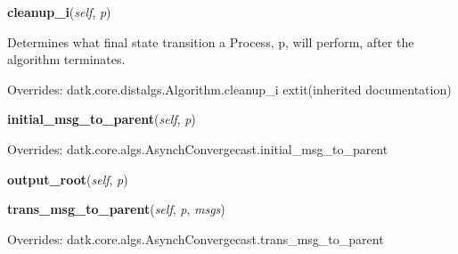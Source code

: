     \vspace{0.5ex}

\hspace{.8\funcindent}\begin{boxedminipage}{\funcwidth}

    \raggedright \textbf{cleanup\_i}(\textit{self}, \textit{p})

\setlength{\parskip}{2ex}
    Determines what final state transition a Process, p, will perform, 
    after the algorithm terminates.

\setlength{\parskip}{1ex}
      Overrides: datk.core.distalgs.Algorithm.cleanup\_i 	extit{(inherited documentation)}

    \end{boxedminipage}

    \vspace{0.5ex}

\hspace{.8\funcindent}\begin{boxedminipage}{\funcwidth}

    \raggedright \textbf{initial\_msg\_to\_parent}(\textit{self}, \textit{p})

\setlength{\parskip}{2ex}
\setlength{\parskip}{1ex}
      Overrides: datk.core.algs.AsynchConvergecast.initial\_msg\_to\_parent

    \end{boxedminipage}

    \label{datk:core:algs:AsynchConvergeHeight:output_root}

    \vspace{0.5ex}

\hspace{.8\funcindent}\begin{boxedminipage}{\funcwidth}

    \raggedright \textbf{output\_root}(\textit{self}, \textit{p})

\setlength{\parskip}{2ex}
\setlength{\parskip}{1ex}
    \end{boxedminipage}

    \vspace{0.5ex}

\hspace{.8\funcindent}\begin{boxedminipage}{\funcwidth}

    \raggedright \textbf{trans\_msg\_to\_parent}(\textit{self}, \textit{p}, \textit{msgs})

\setlength{\parskip}{2ex}
\setlength{\parskip}{1ex}
      Overrides: datk.core.algs.AsynchConvergecast.trans\_msg\_to\_parent

    \end{boxedminipage}

